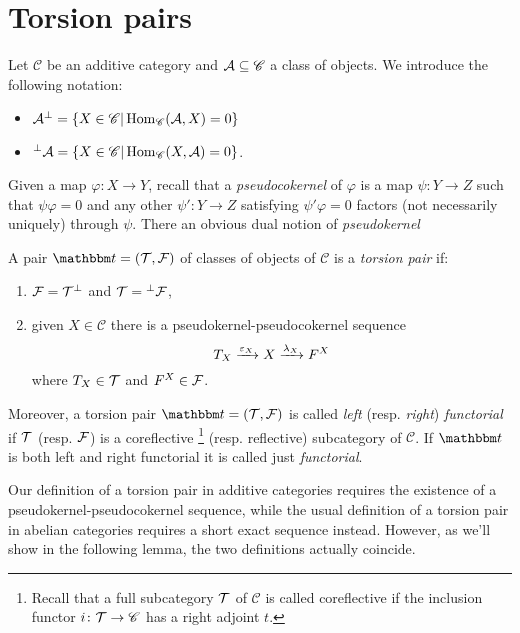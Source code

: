 \section{Torsion pairs}

Let $\mathscr{C}$ be an additive category and $\mathcal{A}\subseteq \mathscr{C}$ a class of objects. We introduce the following notation:
\begin{itemize}
  \item $\mathcal{A}^\perp = \{X\in\mathscr{C}| \operatorname{Hom}_{\mathscr{C}}(\mathcal{A},X)=0\}$
  \item ${^\perp \mathcal{A}}=\{ X\in \mathscr{C}| \operatorname{Hom}_{\mathscr{C}}(X,\mathcal{A})=0\}$.
\end{itemize}

Given a map $\varphi:X\to Y$, recall that a \emph{pseudocokernel} of $\varphi$ is a map $\psi:Y\to Z$ such that $\psi\varphi=0$ and any other $\psi':Y\to Z$ satisfying $\psi'\varphi=0$ factors (not necessarily uniquely) through $\psi$. There an obvious dual notion of \emph{pseudokernel}

\begin{definition}\label{5:def:torsion_pair}
  A pair $\t=(\T,\F)$ of classes of objects of $\mathscr{C}$ is a \emph{torsion pair} if:
  \begin{enumerate}
    \item $\mathcal{F}=\mathcal{T}^\perp$ and $\mathcal{T} = {^\perp \mathcal{F}}$,
    \item given $X\in \mathscr{C}$ there is a pseudokernel-pseudocokernel sequence
      \begin{equation*}
        T_X\xrightarrow{\varepsilon_X} X\xrightarrow{\lambda_X} F^X
      \end{equation*}
      where $T_X\in\mathcal{T}$ and $F^X\in\mathcal{F}$.
  \end{enumerate}
  Moreover, a torsion pair $\t=(\T,\F)$ is called \emph{left} (resp. \emph{right}) \emph{functorial} if $\mathcal{T}$ (resp. $\mathcal{F}$) is a coreflective
  \footnote{Recall that a full subcategory $\mathcal{T}$ of $\mathscr{C}$ is called coreflective if the inclusion functor $i\colon\mathcal{T}\to \mathscr{C}$ has a right adjoint $t$.}
  (resp. reflective) subcategory of $\mathscr{C}$. If $\t$ is both left and right functorial it is called just \emph{functorial}.
\end{definition}

\begin{rmk}
  Our definition of a torsion pair in additive categories requires the existence of a pseudokernel-pseudocokernel sequence, while the usual definition of a torsion pair in abelian categories requires a short exact sequence instead. However, as we'll show in the following lemma, the two definitions actually coincide.
\end{rmk}


